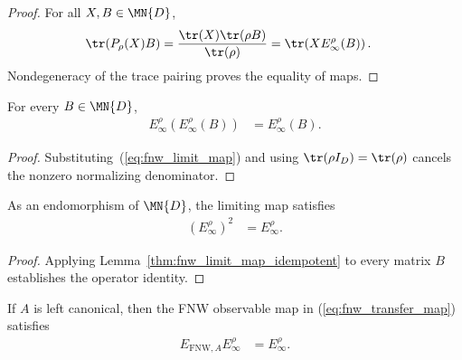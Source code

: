 \begin{proof}
    \leanok
    For all $X,B\in\MN{D}$,
    \begin{align}
        \tr(P_\rho(X)B)
         & =\frac{\tr(X)\tr(\rho B)}{\tr(\rho)}
        =\tr\!\left(XE_\infty^\rho(B)\right).
    \end{align}
    Nondegeneracy of the trace pairing proves the equality of maps.
\end{proof}

\begin{lemma}
    \label{thm:fnw_limit_map_idempotent}
    \leanok
    For every $B\in\MN{D}$,
    \begin{align}
        E_\infty^\rho\!\left(E_\infty^\rho(B)\right)
         & =E_\infty^\rho(B).
        \label{eq:fnw_limit_map_idempotent}
    \end{align}
\end{lemma}

\begin{proof}
    \leanok
    Substituting~(\ref{eq:fnw_limit_map}) and using
    $\tr(\rho I_D)=\tr(\rho)$ cancels the nonzero normalizing denominator.
\end{proof}

\begin{lemma}
    \label{thm:fnw_limit_map_projection}
    \leanok
    As an endomorphism of $\MN{D}$, the limiting map satisfies
    \begin{align}
        (E_\infty^\rho)^2 & =E_\infty^\rho.
        \label{eq:fnw_limit_map_projection}
    \end{align}
\end{lemma}

\begin{proof}
    \leanok
    Applying Lemma~\ref{thm:fnw_limit_map_idempotent} to every matrix $B$
    establishes the operator identity.
\end{proof}

\begin{lemma}
    \label{thm:fnw_transfer_absorbs_limit}
    \leanok
    If $A$ is left canonical, then the FNW observable map in
    (\ref{eq:fnw_transfer_map}) satisfies
    \begin{align}
        E_{\mathrm{FNW},A}E_\infty^\rho & =E_\infty^\rho.
        \label{eq:fnw_transfer_absorbs_limit}
    \end{align}
\end{lemma}

